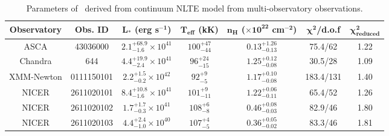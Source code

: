 	
	\begin{table}[!htb]
    	\centering
    	\caption{Parameters of \source\ derived from continuum NLTE model from multi-observatory observations.}
    	\label{tab:res-fitting}
    	\begin{tabular}{ccccccc}
			\hline
			{\textbf{Observatory}} & {\textbf{Obs. ID}} & {$\boldsymbol{L_*}$ \textbf{(erg s$\boldsymbol{^{-1}}$)}} & {\textbf{$\boldsymbol{T_\text{eff}}$ (kK)}} & {\textbf{$\boldsymbol{n_H}$ ($\boldsymbol{\times 10^{22}}$ cm$\boldsymbol{^{-2}}$)}} & {$\boldsymbol{\chi^2}$/\textbf{d.o.f}} & {$\boldsymbol{\chi^2_\text{reduced}}$} \\
			\hline
			{ASCA} & {43036000} & {$2.1_{-1.6}^{+68.9}\times 10^{41}$} & {$100_{-44}^{+47}$} & {$0.13_{-0.13}^{+1.26}$} & {75.4/62} & {1.22} \\ %
			{Chandra} & {644} & {$4.4_{-2.4}^{+19.9}\times 10^{41}$} & {$96_{-15}^{+24}$} & {$1.25_{-0.08}^{+0.12}$} & {30.5/28} & {1.09} \\ %
			{XMM-Newton} & {0111150101} & {$2.2_{-0.2}^{+1.5}\times 10^{42}$} & {$92_{-5}^{+9}$} & {$1.17_{-0.08}^{+0.10}$} & {183.4/131} & {1.40} \\ %
			{NICER} & {2611020101} & {$8.4_{-1.6}^{+10.8}\times 10^{41}$} & {$101_{-11}^{+9}$} & {$1.22_{-0.11}^{+0.06}$} & {65.4/52} & {1.26} \\ %
			{NICER} & {2611020102} & {$1.7_{-0.3}^{+1.7}\times 10^{41}$} & {$108_{-8}^{+6}$} & {$0.46_{-0.03}^{+0.08}$} & {82.9/46} & {1.80} \\ %
			{NICER} & {2611020103} & {$4.4_{-1.0}^{+2.4}\times 10^{40}$} & {$107_{-5}^{+4}$} & {$0.36_{-0.02}^{+0.05}$} & {83.3/46} & {1.81} \\ %
			\hline
		\end{tabular}
	\end{table}
    
